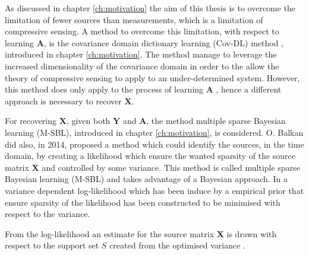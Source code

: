 As discussed in chapter \ref{ch:motivation} the aim of this thesis is to overcome the limitation of fewer sources than measurements, which is a limitation of compressive sensing.  
A method to overcome this limitation, with respect to learning $\mathbf{A}$, is the covariance domain dictionary learning (Cov-DL) method \cite{Balkan2015}, introduced in chapter \ref{ch:motivation}. The method manage to leverage the increased dimensionality of the covariance domain in order to the allow the theory of compressive sensing to apply to an under-determined system.     
However, this method does only apply to the process of learning $\mathbf{A}$ , hence a different approach is necessary to recover $\mathbf{X}$.

For recovering $\mathbf{X}$, given both $\mathbf{Y}$ and $\mathbf{A}$, the method multiple sparse Bayesian learning (M-SBL), introduced in chapter \ref{ch:motivation}, is considered.
O. Balkan \cite{Balkan2014} did also, in 2014, proposed a method which could identify the sources, in the time domain, by creating a likelihood which ensure the wanted sparsity of the source matrix $\mathbf{X}$ and controlled by some variance. This method is called multiple sparse Bayesian learning (M-SBL) and takes advantage of a Bayesian approach. 
In \cite{Balkan2014} a variance dependent log-likelihood which has been induce  by a empirical prior that ensure sparsity of the likelihood has been constructed to be minimised with respect to the variance. 

From the log-likelihood an estimate for the source matrix $\mathbf{X}$ is drawn with respect to the support set $S$ created from the optimised variance .






